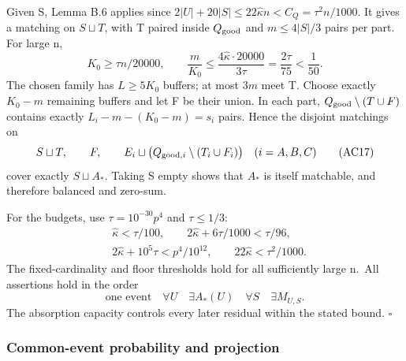 \documentclass[11pt,a4paper]{article}
\begin{document}
Given S, Lemma B.6 applies since \(2|U|+20|S|\le22\widehat\kappa n<C_Q=\tau^2n/1000\). It gives a matching on \(S\sqcup T\), with T paired inside \(Q_{\rm good}\) and \(m\le4|S|/3\) pairs per part. For large n, \begin{equation}
K_0\ge\tau n/20000,\qquad
 \frac m{K_0}\le\frac{4\widehat\kappa\cdot20000}{3\tau}
 =\frac{2\tau}{75}<\frac1{50}.
\tag{AC16a}\label{eq:AC16a}
\end{equation} The chosen family has \(L\ge5K_0\) buffers; at most \(3m\) meet T. Choose exactly \(K_0-m\) remaining buffers and let F be their union. In each part, \(Q_{\rm good}\setminus(T\cup F)\) contains exactly \(L_i-m-(K_0-m)=s_i\) pairs. Hence the disjoint matchings on \begin{equation}
S\sqcup T,\qquad F,\qquad
 E_i\sqcup\bigl(Q_{{\rm good},i}\setminus(T_i\cup F_i)\bigr)
 \quad(i=A,B,C)
\tag{AC17}\label{eq:AC17}
\end{equation} cover exactly \(S\sqcup A_*\). Taking S empty shows that \(A_*\) is itself matchable, and therefore balanced and zero-sum.

For the budgets, use \(\tau=10^{-30}p^4\) and \(\tau\le1/3\): \begin{equation}
\begin{aligned}
 &\widehat\kappa<\tau/100,\qquad
 2\widehat\kappa+6\tau/1000<\tau/96,\\
 &2\widehat\kappa+10^5\tau<p^4/10^{12},\qquad
 22\widehat\kappa<\tau^2/1000.
\end{aligned}
\tag{AC18}\label{eq:AC18}
\end{equation} The fixed-cardinality and floor thresholds hold for all sufficiently large n.~All assertions hold in the order \begin{equation}
\text{one event}\quad\forall U\quad\exists A_*(U)\quad
 \forall S\quad\exists M_{U,S}.
\tag{AC19}\label{eq:AC19}
\end{equation} The absorption capacity controls every later residual within the stated bound. \(\square\)

\hypertarget{common-event-probability-and-projection}{%
\subsubsection{Common-event probability and projection}\label{common-event-probability-and-projection}}
\end{document}
